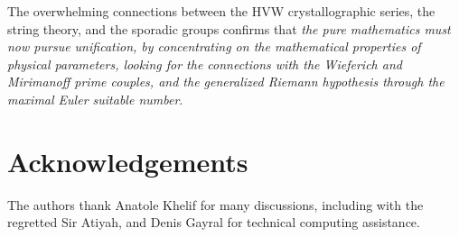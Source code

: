 \documentclass[a4paper,9pt]{article}
\begin{document}
The overwhelming connections between the HVW crystallographic series, the string theory, and the sporadic groups confirms that \textit{the pure mathematics must now pursue unification, by concentrating on the mathematical properties of physical parameters, looking for the connections with the Wieferich and Mirimanoff prime couples, and the generalized Riemann hypothesis through the maximal Euler suitable number}.


 
 \section {Acknowledgements}

The authors thank Anatole Khelif for many discussions, including with the regretted Sir Atiyah, and Denis Gayral for technical computing assistance.

\end{document}
